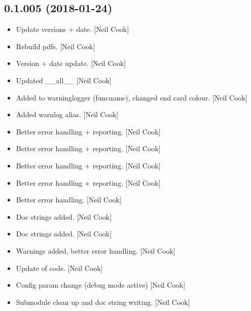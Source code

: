 \documentclass[a4paper,10pt,english]{report}
\begin{document}
\subsection{0.1.005 (2018-01-24)}
\label{\detokenize{misc/changelog:id497}}\begin{itemize}
\item {} 
Update versions + date. {[}Neil Cook{]}

\item {} 
Rebuild pdfs. {[}Neil Cook{]}

\item {} 
Version + date update. {[}Neil Cook{]}

\item {} 
Updated \_\_all\_\_ {[}Neil Cook{]}

\item {} 
Added to warninglogger (funcname), changed end card colour. {[}Neil
Cook{]}

\item {} 
Added warnlog alias. {[}Neil Cook{]}

\item {} 
Better error handling + reporting. {[}Neil Cook{]}

\item {} 
Better error handling + reporting. {[}Neil Cook{]}

\item {} 
Better error handling + reporting. {[}Neil Cook{]}

\item {} 
Better error handling + reporting. {[}Neil Cook{]}

\item {} 
Better error handling. {[}Neil Cook{]}

\item {} 
Doc strings added. {[}Neil Cook{]}

\item {} 
Doc strings added. {[}Neil Cook{]}

\item {} 
Warnings added, better error handling. {[}Neil Cook{]}

\item {} 
Update of code. {[}Neil Cook{]}

\item {} 
Config param change (debug mode active) {[}Neil Cook{]}

\item {} 
Submodule clean up and doc string writing. {[}Neil Cook{]}


\end{itemize}
\end{document}
